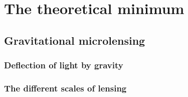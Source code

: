 \documentclass[11pt]{report}
\begin{document}

\chapter{The theoretical minimum}
\label{ch:theoretical_min}

\section{Gravitational microlensing}
\label{sec:microlensing}

\subsection{Deflection of light by gravity}

\subsection{The different scales of lensing}
\end{document}
